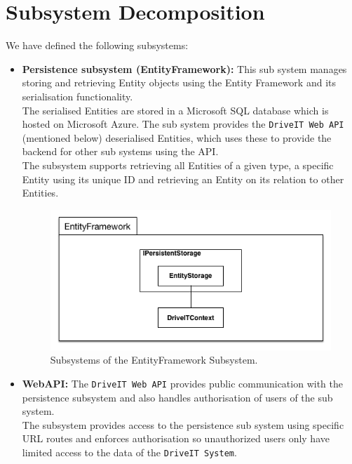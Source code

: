 \section{Subsystem Decomposition}
We have defined the following subsystems:
\begin{itemize}
	\item \textbf{Persistence subsystem (EntityFramework):} This sub system manages storing and retrieving Entity objects using the Entity Framework and its serialisation functionality.\\
	The serialised Entities are stored in a Microsoft SQL database which is hosted on Microsoft Azure. The sub system provides the \texttt{DriveIT Web API} (mentioned below) deserialised Entities, which uses these to provide the backend for other sub systems using the API.\\
	The subsystem supports retrieving all Entities of a given type, a specific Entity using its unique ID and retrieving an Entity on its relation to other Entities. 
	\begin{figure}[H]
		\centering
		\includegraphics[scale=0.30]{Figures/EntityFrameworkSubsystemDecomposition}
		\caption{Subsystems of the EntityFramework Subsystem.}
	\end{figure}
	\item \textbf{WebAPI:} The \texttt{DriveIT Web API} provides public communication with the persistence subsystem and also handles authorisation of users of the sub system.\\
	The subsystem provides access to the persistence sub system using specific URL routes and enforces authorisation so unauthorized users only have limited access to the data of the \texttt{DriveIT System}.\\ 

\end{itemize}
